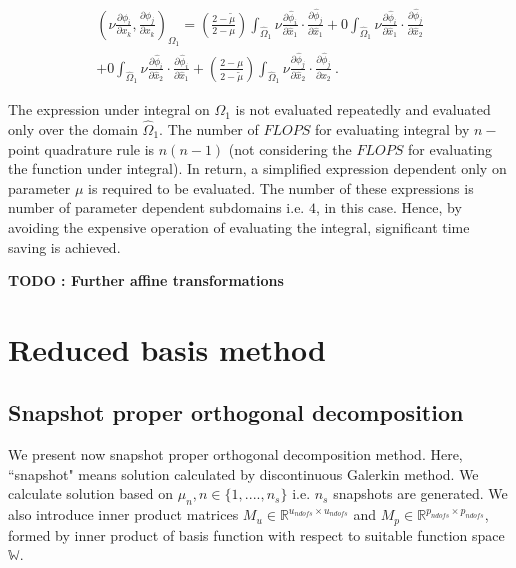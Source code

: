 \documentclass[a4paper,oneside,openright,spanish,english]{book}
\begin{document}
\begin{equation}
\begin{split}
(\nu \frac{\partial \phi_i}{\partial x_k} , \frac{\partial \phi_j}{\partial x_k})_{\Omega_1} = \left(\frac{2 - \tilde{\mu}}{2 - \mu} \right) \int_{\hat{\Omega}_1} \nu \frac{\partial \hat{\phi}_i}{\partial \hat{x}_1} \cdot \frac{\partial \hat{\phi}_j}{\partial \hat{x}_1} + 0 \int_{\hat{\Omega}_1} \nu \frac{\partial \hat{\phi}_i}{\partial \hat{x}_1} \cdot \frac{\partial \hat{\phi}_j}{\partial \hat{x}_2} \\ + 0 \int_{\hat{\Omega}_1} \nu \frac{\partial \hat{\phi}_i}{\partial \hat{x}_2} \cdot \frac{\partial \hat{\phi}_i}{\partial \hat{x}_1} + \left( \frac{2 - \mu}{2 - \tilde{\mu}} \right) \int_{\hat{\Omega}_1} \nu \frac{\partial \hat{\phi}_j}{\partial \hat{x}_2} \cdot \frac{\partial \hat{\phi}_j}{\partial \hat{x}_2} \ .
\end{split}
\end{equation}

The expression under integral on $\Omega_1$ is not evaluated repeatedly and evaluated only over the domain $\hat{\Omega}_1$. The number of $FLOPS$ for evaluating integral by $n-$point quadrature rule is $n(n-1)$ (not considering the $FLOPS$ for evaluating the function under integral). In return, a simplified expression dependent only on parameter $\mu$ is required to be evaluated. The number of these expressions is number of parameter dependent subdomains i.e. $4$, in this case. Hence, by avoiding the expensive operation of evaluating the integral, significant time saving is achieved. 

\textbf{TODO : Further affine transformations}

\chapter{Reduced basis method}

\section{Snapshot proper orthogonal decomposition}

We present now snapshot proper orthogonal decomposition method. Here, ``snapshot" means solution calculated by discontinuous Galerkin method. We calculate solution based on $\mu_n, n \in \lbrace 1,....,n_s \rbrace$ i.e. $n_s$ snapshots are generated. We also introduce inner product matrices $M_u \in \mathbb{R}^{u_{ndofs} \times u_{ndofs}}$ and $M_p \in \mathbb{R}^{p_{ndofs} \times p_{ndofs}}$, formed by inner product of basis function with respect to suitable function space $\mathbb{W}$.
\end{document}
